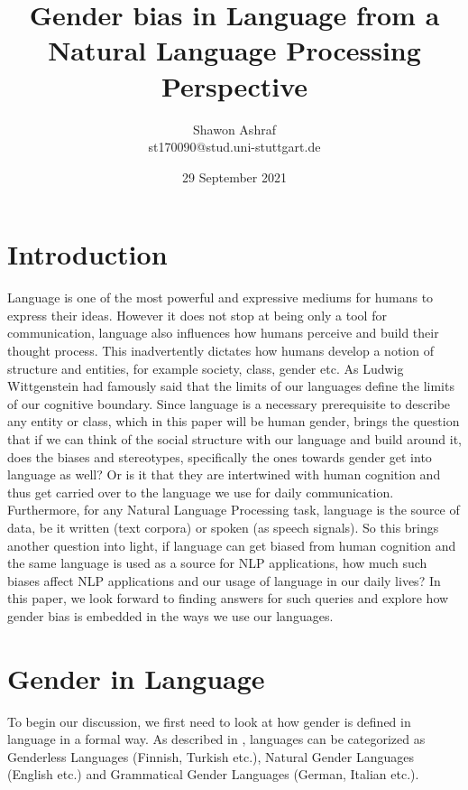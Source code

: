 \documentclass{article}
\title{Gender bias in Language from a Natural Language Processing Perspective}
\author{Shawon Ashraf \\ st170090@stud.uni-stuttgart.de}
\date{29 September 2021}
\begin{document}
\maketitle

\section{Introduction}
Language is one of the most powerful and expressive mediums for humans to express their ideas. However it does not stop at being only a tool for communication, language also influences how humans perceive and build their thought process. This inadvertently dictates how humans develop a notion of structure and entities, for example society, class, gender etc. As Ludwig Wittgenstein had famously said that the limits of our languages define the limits of our cognitive boundary. Since language is a necessary prerequisite to describe any entity or class, which in this paper will be human gender, brings the question that if we can think of the social structure with our language and build around it, does the biases and stereotypes, specifically the ones towards gender get into language as well? Or is it that they are intertwined with human cognition and thus get carried over to the language we use for daily communication. Furthermore, for any Natural Language Processing task, language is the source of data, be it written (text corpora) or spoken (as speech signals). So this brings another question into light, if language can get biased from human cognition and the same language is used as a source for NLP applications, how much such biases affect NLP applications and our usage of language in our daily lives? In this paper, we look forward to finding answers for such queries and explore how gender bias is embedded in the ways we use our languages.

\section{Gender in Language}
To begin our discussion, we first need to look at how gender is defined in language in a formal way. As described in \cite{menegatti2017gender}, languages can be categorized \cite{braun2005cognitive} as Genderless Languages (Finnish, Turkish etc.), Natural Gender Languages (English etc.) and Grammatical Gender Languages (German, Italian etc.).
\end{document}
